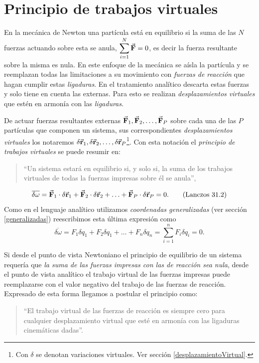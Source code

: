 \documentclass[12pt, spanish, a4paper, ]{article}
\begin{document}
\section{Principio de trabajos virtuales}\label{trabajosVirtuales} %
En la mecánica de Newton una partícula está en equilibrio si la suma de las \(N\) fuerzas actuando sobre esta se anula, \(\displaystyle\sum_{i=1}^N \va{F}= 0\), es decir la fuerza resultante sobre la misma es nula.
En este enfoque de la mecánica se aísla la partícula y se reemplazan todas las limitaciones a su movimiento con \emph{fuerzas de reacción} que hagan cumplir estas \emph{ligaduras}.
En el tratamiento analítico descarta estas fuerzas y solo tiene en cuenta las externas.
Para esto se realizan \emph{desplazamientos virtuales} que estén en armonía con las \emph{ligaduras}.

De actuar fuerzas resultantes externas \(\va{F}_1, \va{F}_2, \ldots, \va{F}_P\) sobre cada una de las \(P\) partículas que componen un sistema, sus correspondientes \emph{desplazamientos virtuales} los notaremos \(\delta \va{r}_1, \delta \va{r}_2, \ldots, \delta \va{r}_P\)\footnote{Con \(\delta\) se denotan variaciones virtuales. Ver sección \ref{desplazamientoVirtual}.}.
Con esta notación el \emph{principio de trabajos virtuales} se puede resumir en:
\begin{quote}
 ``Un sistema estará en equilibrio si, y solo si, la suma de los trabajos virtuales de todas la fuerzas impresas sobre él se anula'',
\end{quote}
\begin{equation}\label{Lanczos31.2}
	\overline {\delta \omega} = 
	\va{F}_1 \cdot \delta \va{r}_1+ \va{F}_2 \cdot \delta \va{r}_2+ \ldots+ \va{F}_P \cdot \delta \va{r}_P = 0.
	\tag{Lanczos 31.2}
\end{equation}
Como en el lenguaje analítico utilizamos \emph{coordenadas generalizadas} (ver sección \ref{generalizadas}) reescribimos esta última expresión como
\begin{equation}\label{Lanczos31.4}
	\overline {\delta \omega} = 
	F_1 \delta q_1+ F_2 \delta q_1+ \ldots + F_n \delta q_n = \sum_{i=1}^n F_i \delta q_i = 0. 
	\tag{Lanczos 31.4}
\end{equation}

Si desde el punto de vista Newtoniano el principio de equilibrio de un sistema requería que \emph{la suma de las fuerzas impresas con las de reacción sea nula}, desde el punto de vista analítico el trabajo virtual de las fuerzas impresas puede reemplazarse con el valor negativo del trabajo de las fuerzas de reacción.
Expresado de esta forma llegamos a postular el principio como:
\begin{quote} 
``El trabajo virtual de las fuerzas de reacción es siempre cero para cualquier desplazamiento virtual que esté en armonía con las ligaduras cinemáticas dadas''.
\end{quote} 
\end{document}
